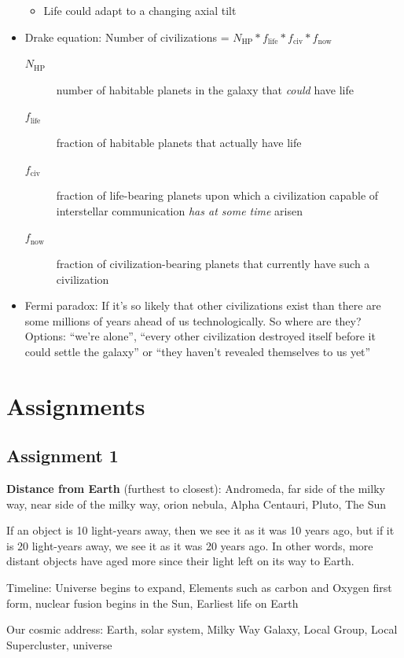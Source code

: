 \documentclass[12pt]{article}
\begin{document}
\begin{itemize}
\begin{itemize}
\item Life could adapt to a changing axial tilt
\end{itemize}
\item Drake equation: Number of civilizations = $N_\text{HP} * f_\text{life} * f_\text{civ} * f_\text{now}$
\begin{description}
\item[$N_\text{HP}$] number of habitable planets in the galaxy that \emph{could} have life
\item[$f_\text{life}$] fraction of habitable planets that actually have life
\item[$f_\text{civ}$] fraction of life-bearing planets upon which a civilization capable of interstellar communication \emph{has at some time} arisen
\item[$f_\text{now}$] fraction of civilization-bearing planets that currently have such a civilization
\end{description}
\item Fermi paradox: If it's so likely that other civilizations exist than there are some millions of years ahead of us technologically.  So where are they?  Options: ``we're alone'', ``every other civilization destroyed itself before it could settle the galaxy'' or ``they haven't revealed themselves to us yet''
\end{itemize}

\section{Assignments}
\subsection{Assignment 1}
{\bf Distance from Earth} (furthest to closest): Andromeda, far side of the milky way, near side of the milky way, orion nebula, Alpha Centauri, Pluto, The Sun

If an object is 10 light-years away, then we see it as it was 10 years ago, but if it is 20 light-years away, we see it as it was 20 years ago. In other words, more distant objects have aged more since their light left on its way to Earth.

Timeline: Universe begins to expand, Elements such as carbon and Oxygen first form, nuclear fusion begins in the Sun, Earliest life on Earth

Our cosmic address: Earth, solar system, Milky Way Galaxy, Local Group, Local Supercluster, universe
\end{document}
